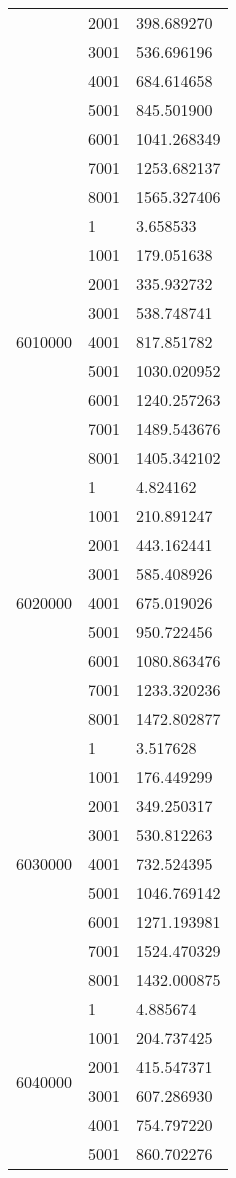 \begin{table}[htb!]
\begin{tabular}{lll}
 & 2001 & 398.689270 \\
 & 3001 & 536.696196 \\
 & 4001 & 684.614658 \\
 & 5001 & 845.501900 \\
 & 6001 & 1041.268349 \\
 & 7001 & 1253.682137 \\
 & 8001 & 1565.327406 \\
\multirow[c]{9}{*}{6010000} & 1 & 3.658533 \\
 & 1001 & 179.051638 \\
 & 2001 & 335.932732 \\
 & 3001 & 538.748741 \\
 & 4001 & 817.851782 \\
 & 5001 & 1030.020952 \\
 & 6001 & 1240.257263 \\
 & 7001 & 1489.543676 \\
 & 8001 & 1405.342102 \\
\multirow[c]{9}{*}{6020000} & 1 & 4.824162 \\
 & 1001 & 210.891247 \\
 & 2001 & 443.162441 \\
 & 3001 & 585.408926 \\
 & 4001 & 675.019026 \\
 & 5001 & 950.722456 \\
 & 6001 & 1080.863476 \\
 & 7001 & 1233.320236 \\
 & 8001 & 1472.802877 \\
\multirow[c]{9}{*}{6030000} & 1 & 3.517628 \\
 & 1001 & 176.449299 \\
 & 2001 & 349.250317 \\
 & 3001 & 530.812263 \\
 & 4001 & 732.524395 \\
 & 5001 & 1046.769142 \\
 & 6001 & 1271.193981 \\
 & 7001 & 1524.470329 \\
 & 8001 & 1432.000875 \\
\multirow[c]{9}{*}{6040000} & 1 & 4.885674 \\
 & 1001 & 204.737425 \\
 & 2001 & 415.547371 \\
 & 3001 & 607.286930 \\
 & 4001 & 754.797220 \\
 & 5001 & 860.702276 \\

\end{tabular}
\end{table}
